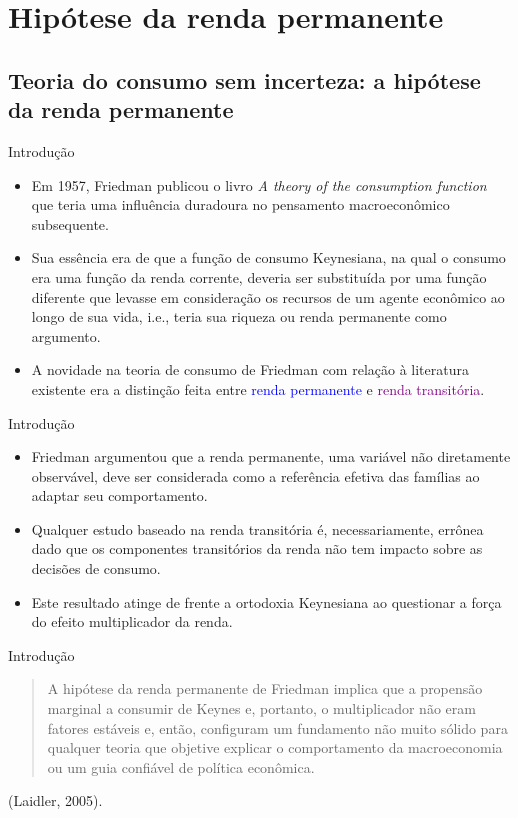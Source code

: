 \documentclass[10pt]{beamer}
\begin{document}
\section{Hipótese da renda permanente}
\subsection{Teoria do consumo sem incerteza: a hipótese da renda permanente}
\begin{frame}{Introdução}
    \begin{itemize}
        \item Em 1957, Friedman publicou o livro \emph{A theory of the consumption function} que teria uma influência duradoura no pensamento macroeconômico subsequente.
        \bigskip
        \item Sua essência era de que a função de consumo Keynesiana, na qual o consumo era uma função da renda corrente, deveria ser substituída por uma função diferente que levasse em consideração os recursos de um agente econômico ao longo de sua vida, i.e., teria sua riqueza ou renda permanente como argumento.
        \bigskip
        \item A novidade na teoria de consumo de Friedman com relação à literatura existente era a distinção feita entre \textcolor{blue}{renda permanente} e \textcolor{purple}{renda transitória}.
    \end{itemize}
\end{frame}

\begin{frame}{Introdução}
    \begin{itemize}
        \item Friedman argumentou que a renda permanente, uma variável não diretamente observável, deve ser considerada como a referência efetiva das famílias ao adaptar seu comportamento.
        \bigskip
        \item Qualquer estudo baseado na renda transitória é, necessariamente, errônea dado que os componentes transitórios da renda não tem impacto sobre as decisões de consumo.
        \bigskip
        \item Este resultado atinge de frente a ortodoxia Keynesiana ao questionar a força do efeito multiplicador da renda.
    \end{itemize}
\end{frame}

\begin{frame}{Introdução}
    \begin{quote}
        A hipótese da renda permanente de Friedman implica que a propensão marginal a consumir de Keynes e, portanto, o multiplicador não eram fatores estáveis e, então, configuram um fundamento não muito sólido para qualquer teoria que objetive explicar o comportamento da macroeconomia ou um guia confiável de política econômica.
    \end{quote}
    \begin{flushright}
    (Laidler, 2005).
    \end{flushright}
\end{frame}
\end{document}
